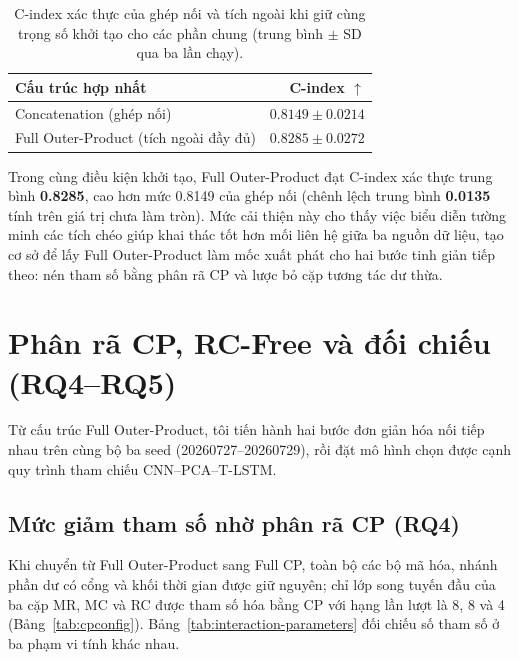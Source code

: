 \begin{table}[H]
\centering\small
\caption[So sánh ghép nối và tích ngoài]{C-index xác thực của ghép nối và tích ngoài khi giữ cùng trọng số khởi tạo cho các phần chung (trung bình $\pm$ SD qua ba lần chạy).}
\label{tab:matched-fusion}
\begin{tabularx}{\linewidth}{@{}Y r@{}}
\toprule
\textbf{Cấu trúc hợp nhất} & \textbf{C-index $\uparrow$} \\
\midrule
Concatenation (ghép nối) & $0.8149\pm0.0214$ \\
Full Outer-Product (tích ngoài đầy đủ) & $\mathbf{0.8285\pm0.0272}$ \\
\bottomrule
\end{tabularx}
\end{table}

Trong cùng điều kiện khởi tạo, Full Outer-Product đạt C-index xác thực trung bình \textbf{0.8285}, cao hơn mức 0.8149 của ghép nối (chênh lệch trung bình \textbf{0.0135} tính trên giá trị chưa làm tròn). Mức cải thiện này cho thấy việc biểu diễn tường minh các tích chéo giúp khai thác tốt hơn mối liên hệ giữa ba nguồn dữ liệu, tạo cơ sở để lấy Full Outer-Product làm mốc xuất phát cho hai bước tinh giản tiếp theo: nén tham số bằng phân rã CP và lược bỏ cặp tương tác dư thừa.

\section{Phân rã CP, RC-Free và đối chiếu (RQ4--RQ5)}
\label{sec:cp-results}
\label{sec:ablation-results}
\label{sec:rcfree-multiseed}
\label{sec:standardized-benchmark}
\label{sec:paper-adaptation-results}

Từ cấu trúc Full Outer-Product, tôi tiến hành hai bước đơn giản hóa nối tiếp nhau trên cùng bộ ba seed (20260727--20260729), rồi đặt mô hình chọn được cạnh quy trình tham chiếu CNN--PCA--T-LSTM.

\subsection{Mức giảm tham số nhờ phân rã CP (RQ4)}
\label{sec:computational-efficiency}
Khi chuyển từ Full Outer-Product sang Full CP, toàn bộ các bộ mã hóa, nhánh phần dư có cổng và khối thời gian được giữ nguyên; chỉ lớp song tuyến đầu của ba cặp MR, MC và RC được tham số hóa bằng CP với hạng lần lượt là 8, 8 và 4 (Bảng~\ref{tab:cpconfig}). Bảng~\ref{tab:interaction-parameters} đối chiếu số tham số ở ba phạm vi tính khác nhau.

